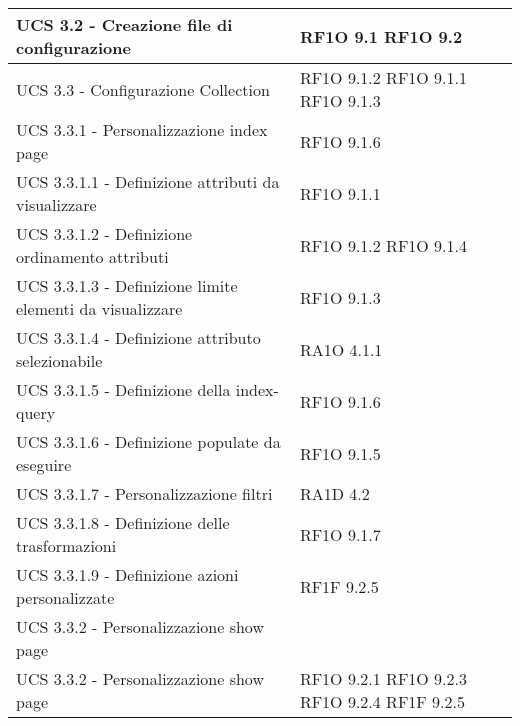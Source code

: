 \begin{center}
\begin{longtable}{ | p{5cm} | p{5cm} |}
            UCS 3.2  - Creazione file di configurazione &  RF1O 9.1 \newline  RF1O 9.2 \newline  \\ \hline      
            UCS 3.3  - Configurazione Collection &  RF1O 9.1.2 \newline  RF1O 9.1.1 \newline  RF1O 9.1.3 \newline  \\ \hline      
            UCS 3.3.1 - Personalizzazione index page &  RF1O 9.1.6 \newline  \\ \hline      
            UCS 3.3.1.1  - Definizione attributi da visualizzare &  RF1O 9.1.1 \newline  \\ \hline      
            UCS 3.3.1.2  -  Definizione ordinamento attributi &  RF1O 9.1.2 \newline  RF1O 9.1.4 \newline  \\ \hline      
            UCS 3.3.1.3  - Definizione limite elementi da visualizzare &  RF1O 9.1.3 \newline  \\ \hline      
            UCS 3.3.1.4 - Definizione attributo selezionabile &  RA1O 4.1.1 \newline  \\ \hline      
            UCS 3.3.1.5 - Definizione della index-query &  RF1O 9.1.6 \newline  \\ \hline      
            UCS 3.3.1.6 - Definizione populate da eseguire &  RF1O 9.1.5 \newline  \\ \hline      
            UCS 3.3.1.7 - Personalizzazione filtri &  RA1D 4.2 \newline  \\ \hline      
            UCS 3.3.1.8 - Definizione delle trasformazioni &  RF1O 9.1.7 \newline  \\ \hline      
            UCS 3.3.1.9 - Definizione azioni personalizzate &  RF1F 9.2.5 \newline  \\ \hline      
            UCS 3.3.2 - Personalizzazione show page &  \\ \hline      
            UCS 3.3.2  -  Personalizzazione show page &  RF1O 9.2.1 \newline  RF1O 9.2.3 \newline  RF1O 9.2.4 \newline  RF1F 9.2.5 \newline  \\ \hline      

\end{longtable}
\end{center}
